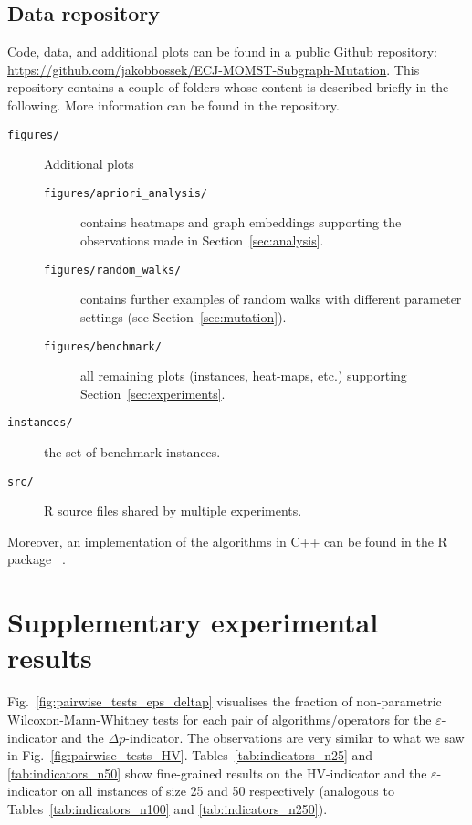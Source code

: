 \documentclass[twoside]{article}
\begin{document}
\subsection{Data repository}

Code, data, and additional plots can be found in a public Github repository: \url{https://github.com/jakobbossek/ECJ-MOMST-Subgraph-Mutation}. This repository contains a couple of folders whose content is described briefly in the following. More information can be found in the repository.
\begin{description}
    \item[\texttt{figures/}] Additional plots
    \begin{description}
        \item[\texttt{figures/apriori\_analysis/}] contains heatmaps and graph embeddings supporting the observations made in Section~\ref{sec:analysis}.
        \item[\texttt{figures/random\_walks/}] contains further examples of random walks with different parameter settings (see Section~\ref{sec:mutation}).
        \item[\texttt{figures/benchmark/}] all remaining plots (instances, heat-maps, etc.) supporting Section~\ref{sec:experiments}.
    \end{description}
    \item[\texttt{instances/}] the set of benchmark instances.
    \item[\texttt{src/}] R source files shared by multiple experiments.
\end{description}
Moreover, an implementation of the algorithms in C++ can be found in the R package ~\citep{Bo17}.

\section{Supplementary experimental results}

Fig.~\ref{fig:pairwise_tests_eps_deltap} visualises the fraction of non-parametric Wilcoxon-Mann-Whitney tests for each pair of algorithms/operators for the $\varepsilon$-indicator and the $\Delta p$-indicator. The observations are very similar to what we saw in Fig.~\ref{fig:pairwise_tests_HV}.
Tables~\ref{tab:indicators_n25} and \ref{tab:indicators_n50} show fine-grained results on the HV-indicator and the $\varepsilon$-indicator on all instances of size 25 and 50 respectively (analogous to Tables~\ref{tab:indicators_n100} and \ref{tab:indicators_n250}).
\end{document}
